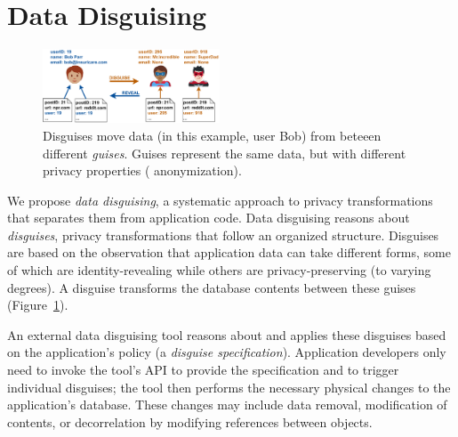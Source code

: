 \section{Data Disguising}
\begin{figure}[t]
    \centering
    \includegraphics[width=0.47\textwidth]{img/disguises_new}

    \caption{Disguises move data (in this example, user Bob) from
             beteeen different \emph{guises}. Guises represent the
             same data, but with different privacy properties (\eg
             anonymization).}
    \label{fig:example}
\end{figure}

%
We propose \emph{data disguising}, a systematic approach to privacy
transformations that separates them from application code.
%
Data disguising reasons about \emph{disguises}, privacy transformations that
follow an organized structure.
%
Disguises are based on the observation that application data can take
different forms, some of which are identity-revealing while others are
privacy-preserving (to varying degrees).
%
%
A disguise transforms the database contents between these guises
(Figure~\ref{fig:example}).
%
%
%
%

%
An external data disguising tool reasons about and applies these disguises
based on the application's policy (a \emph{disguise specification}).
%
Application developers only need to invoke the tool's API to provide the
specification and to trigger individual disguises; the tool then performs the
necessary physical changes to the application's database.
%
These changes may include data removal, modification of contents, or
decorrelation by modifying references between objects.
%

